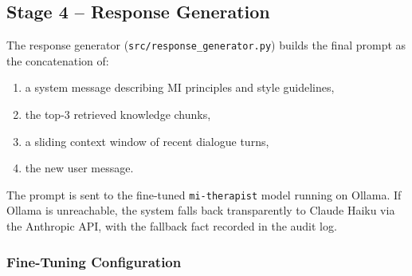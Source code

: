 \subsection{Stage 4 -- Response Generation}

The response generator (\texttt{src/response\_generator.py}) builds the final
prompt as the concatenation of:
\begin{enumerate}
    \item a system message describing MI principles and style guidelines,
    \item the top-3 retrieved knowledge chunks,
    \item a sliding context window of recent dialogue turns,
    \item the new user message.
\end{enumerate}

The prompt is sent to the fine-tuned \texttt{mi-therapist} model running on
Ollama. If Ollama is unreachable, the system falls back transparently to
Claude Haiku via the Anthropic API, with the fallback fact recorded in the
audit log.

\subsubsection*{Fine-Tuning Configuration}

